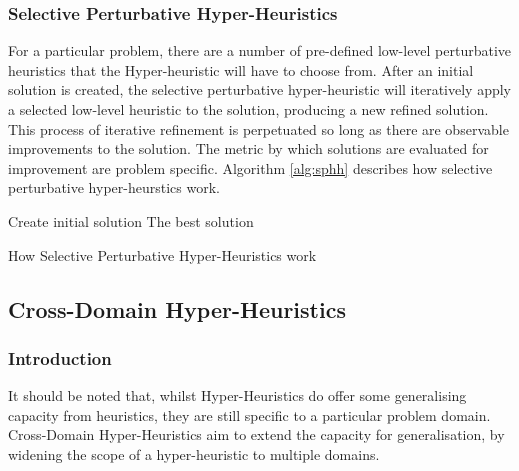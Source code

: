 \documentclass[a4paper,12pt]{article}
\begin{document}
        \subsubsection{Selective Perturbative Hyper-Heuristics}
            \par{
            For a particular problem, there are a number of pre-defined low-level perturbative heuristics that the Hyper-heuristic will have to choose from. After an initial solution is created, the selective perturbative hyper-heuristic will iteratively apply a selected low-level heuristic to the solution, producing a new refined solution. This process of iterative refinement is perpetuated so long as there are observable improvements to the solution. The metric by which solutions are evaluated for improvement are problem specific.\newline 
            \newline
            Algorithm \ref{alg:sphh} describes how selective perturbative hyper-heurstics work.\newline
            \newline
            }
            \begin{algorithm}[H]
                \SetAlgoLined
                Create initial solution\;
                \Return The best solution
                \caption{How Selective Perturbative Hyper-Heuristics work}
                \label{alg:sphh}
            \end{algorithm} 
    \subsection{Cross-Domain Hyper-Heuristics}
        \subsubsection{Introduction}
            \par{It should be noted that, whilst Hyper-Heuristics do offer some generalising capacity from heuristics, they are still specific to a particular problem domain. Cross-Domain Hyper-Heuristics aim to extend the capacity for generalisation, by widening the scope of a hyper-heuristic to multiple domains.\cite{hyperheuristictas}
            }
\end{document}
